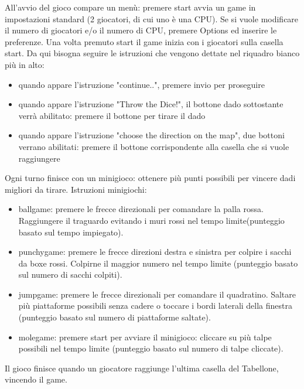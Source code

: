\documentclass[a4paper,12pt]{report}
\begin{document}
All'avvio del gioco compare un menù: premere start avvia un game in impostazioni standard (2 giocatori, di cui uno è una CPU).
%
Se si vuole modificare il numero di giocatori e/o il numero di CPU, premere Options ed inserire le preferenze.
%
Una volta premuto start il game inizia con i giocatori sulla casella start.
%
Da qui bisogna seguire le istruzioni che vengono dettate nel riquadro bianco più in alto:
\begin {itemize}
	\item quando appare l'istruzione "continue..", premere invio per proseguire
	\item quando appare l'istruzione "Throw the Dice!", il bottone dado sottostante verrà abilitato: premere il bottone per tirare il dado
	\item quando appare l'istruzione "choose the direction on the map", due bottoni verrano abilitati: premere il bottone corrispondente alla casella che si vuole raggiungere
\end {itemize}
Ogni turno finisce con un minigioco: ottenere più punti possibili per vincere dadi migliori da tirare.
Istruzioni minigiochi:
\begin {itemize}
	\item ballgame: premere le frecce direzionali per comandare la palla rossa. Raggiungere il traguardo evitando i muri rossi nel tempo limite(punteggio basato sul tempo impiegato).
	\item punchygame: premere le frecce direzioni destra e sinistra per colpire i sacchi da boxe rossi. Colpirne il maggior numero nel tempo limite (punteggio basato sul numero di sacchi colpiti).
	\item jumpgame: premere le frecce direzionali per comandare il quadratino. Saltare più piattaforme possibili senza cadere o toccare i bordi laterali della finestra (punteggio basato sul numero di piattaforme saltate).
	\item molegame: premere start per avviare il minigioco: cliccare su più talpe possibili nel tempo limite (punteggio basato sul numero di talpe cliccate).
\end {itemize}
Il gioco finisce quando un giocatore raggiunge l'ultima casella del Tabellone, vincendo il game.




\end{document}
